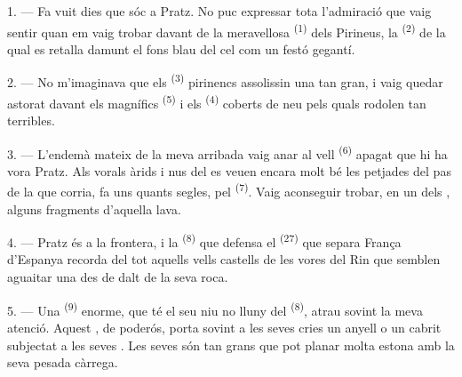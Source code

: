 
\VUsaut{4.0mm}
\VUsaut{3.0mm}

\VUsaut{3.0mm}

\VUsaut{3.0mm}

1. --- Fa vuit dies que sóc a Pratz. No puc expressar tota l'admiració que vaig
sentir quan em vaig trobar davant de la meravellosa 
\textsuperscript{(1)} dels Pirineus, la  \textsuperscript{(2)} de la
qual es retalla damunt el fons blau del cel com un festó gegantí.

2. --- No m'imaginava que els  \textsuperscript{(3)} pirinencs
assolissin una  tan gran, i vaig quedar astorat davant els
magnífics  \textsuperscript{(5)} i els 
\textsuperscript{(4)} coberts de neu pels quals rodolen  tan
terribles.

\VUsaut{3.0mm}
\VUsaut{3.0mm}

3. --- L'endemà mateix de la meva arribada vaig anar al vell 
\textsuperscript{(6)} apagat que hi ha vora Pratz. Als vorals àrids i nus del
 es veuen encara molt bé les petjades del pas de la 
que corria, fa uns quants segles, pel 
\textsuperscript{(7)}. Vaig aconseguir trobar, en un dels ,
alguns fragments d'aquella lava.

4. --- Pratz és a la frontera, i la  \textsuperscript{(8)} que
defensa el  \textsuperscript{(27)} que separa França d'Espanya
recorda del tot aquells vells castells de les vores del Rin que semblen aguaitar
una  des de dalt de la seva roca.

5. --- Una  \textsuperscript{(9)} enorme, que té el seu niu no lluny
del  \textsuperscript{(8)}, atrau sovint la meva atenció. Aquest
, de  poderós, porta sovint a les seves
cries un anyell o un cabrit subjectat a les seves . Les seves
 són tan grans que pot planar molta estona amb la seva pesada
càrrega.

